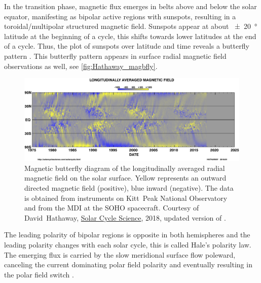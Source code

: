 In the transition phase, magnetic flux emerges in belts above and below the solar equator, manifesting as bipolar active regions with sunspots, resulting in a toroidal/multipolar structured magnetic field. Sunspots appear at about \SI{+-20}{\degree} latitude at the beginning of a cycle, this shifts towards lower latitudes at the end of a cycle. Thus, the plot of sunspots over latitude and time reveals a butterfly pattern \citep{Maunder1904}. This butterfly pattern appears in surface radial magnetic field observations as well, see \autoref{fig:Hathaway_magbfly}.
\begin{figure}[htb]
	\centering
	\includegraphics[width=\textwidth]{figures_of_others/images/Hathaway_magbfly_201801_cropped.png}
	\caption[Courtesy of David~Hathaway, \href{http://solarcyclescience.com/solarcycle.html}{Solar Cycle Science}, 2018, updated version of {\citet[Fig.~17]{Hathaway2015}}.]
	{Magnetic butterfly diagram of the longitudinally averaged radial magnetic field on the solar surface. Yellow represents an outward directed magnetic field (positive), blue inward (negative). The data is obtained from instruments on Kitt~Peak National Observatory and from the MDI at the SOHO spacecraft. Courtesy of David~Hathaway, \href{http://solarcyclescience.com/solarcycle.html}{Solar Cycle Science}, 2018, updated version of \citet[Fig.~17]{Hathaway2015}.}
	\label{fig:Hathaway_magbfly}
\end{figure}
The leading polarity of bipolar regions is opposite in both hemispheres and the leading polarity changes with each solar cycle, this is called Hale's polarity law. The emerging flux is carried by the slow meridional surface flow poleward, canceling the current dominating polar field polarity and eventually resulting in the polar field switch \citep{Hathaway2015}.

